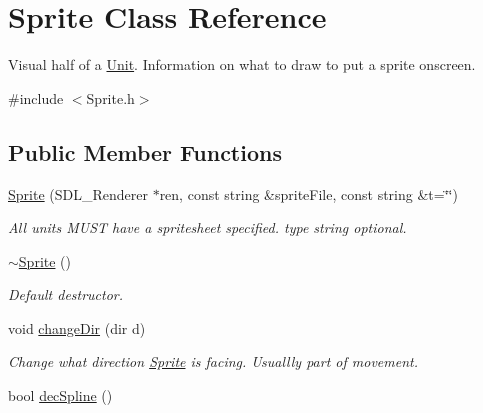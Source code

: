 \hypertarget{class_sprite}{}\section{Sprite Class Reference}
\label{class_sprite}


Visual half of a \hyperlink{class_unit}{Unit}. Information on what to draw to put a sprite onscreen.  




{\ttfamily \#include $<$Sprite.\+h$>$}

\subsection*{Public Member Functions}
\begin{DoxyCompactItemize}
\item 
\hyperlink{class_sprite_a874648e9628df9ca42f3672693adf3a3}{Sprite} (S\+D\+L\+\_\+\+Renderer $\ast$ren, const string \&sprite\+File, const string \&t=\char`\"{}\char`\"{})\hypertarget{class_sprite_a874648e9628df9ca42f3672693adf3a3}{}\label{class_sprite_a874648e9628df9ca42f3672693adf3a3}

\begin{DoxyCompactList}\small\item\em All units M\+U\+ST have a spritesheet specified. type string optional. \end{DoxyCompactList}\item 
\hyperlink{class_sprite_a8accab430f9d90ae5117b57d67e32b84}{$\sim$\+Sprite} ()\hypertarget{class_sprite_a8accab430f9d90ae5117b57d67e32b84}{}\label{class_sprite_a8accab430f9d90ae5117b57d67e32b84}

\begin{DoxyCompactList}\small\item\em Default destructor. \end{DoxyCompactList}\item 
void \hyperlink{class_sprite_a3eadf6ba2634a886862b6e2d9ca93b17}{change\+Dir} (dir d)\hypertarget{class_sprite_a3eadf6ba2634a886862b6e2d9ca93b17}{}\label{class_sprite_a3eadf6ba2634a886862b6e2d9ca93b17}

\begin{DoxyCompactList}\small\item\em Change what direction \hyperlink{class_sprite}{Sprite} is facing. Usuallly part of movement. \end{DoxyCompactList}\item 
bool \hyperlink{class_sprite_af880e3cfcd03b6de68171eef82dc6a69}{dec\+Spline} ()\hypertarget{class_sprite_af880e3cfcd03b6de68171eef82dc6a69}{}\label{class_sprite_af880e3cfcd03b6de68171eef82dc6a69}


\end{DoxyCompactItemize}

